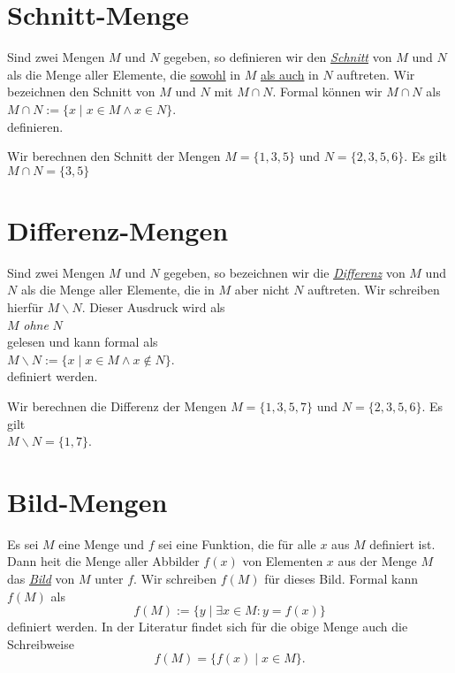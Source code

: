 \section{Schnitt-Menge}
Sind zwei Mengen $M$ und $N$ gegeben, so definieren wir den 
\href{https://de.wikipedia.org/wiki/Menge_(Mathematik)#Schnittmenge_.28Schnitt.2C_auch_.E2.80.9EDurchschnitt.E2.80.9C.29}{\emph{Schnitt}}
von $M$ und $N$ als die Menge aller Elemente, die \underline{sowohl} in $M$ \underline{als auch} in $N$
auftreten.  Wir bezeichnen den Schnitt von $M$ und $N$ mit $M \cap N$.
Formal k\"{o}nnen wir $M \cap N$ als 
\\[0.2cm]
\hspace*{1.3cm} $M \cap N := \{ x \mid x \in M \wedge x \in N \}$.
\\[0.2cm]
definieren.

\example
Wir berechnen den Schnitt der  Mengen $M = \{ 1, 3, 5 \}$ und $N = \{ 2, 3, 5, 6 \}$.  Es gilt
\\[0.2cm]
\hspace*{1.3cm} $M \cap N = \{ 3, 5 \}$
\eoxs

\section{Differenz-Mengen}
 Sind zwei Mengen $M$ und $N$ gegeben, so bezeichnen wir die 
\href{https://de.wikipedia.org/wiki/Menge_(Mathematik)#Differenz_und_Komplement}{\emph{Differenz}}
von $M$ und $N$ als die Menge aller Elemente, die in $M$ aber nicht $N$
 auftreten.  Wir schreiben hierf\"{u}r $M \backslash N$.  Dieser Ausdruck wird als
\\[0.2cm]
\hspace*{1.3cm}
$M$ \emph{ohne} $N$
\\[0.2cm]
gelesen und kann formal als
 \\[0.2cm]
\hspace*{1.3cm} $M \backslash N := \{ x \mid x \in M \wedge x \not\in N \}$. 
 \\[0.2cm] 
definiert werden.


\example
Wir berechnen die Differenz der Mengen $M = \{ 1, 3, 5, 7 \}$ und $N = \{ 2, 3, 5, 6 \}$.  Es gilt
\\[0.2cm]
\hspace*{1.3cm} $M \backslash N = \{ 1, 7 \}$. \eoxs

\section{Bild-Mengen}
Es sei $M$ eine Menge und $f$ sei eine Funktion, die f\"{u}r alle $x$ aus $M$ definiert ist.
Dann hei\3t die Menge aller Abbilder $f(x)$ von Elementen $x$ aus der Menge $M$ das
\href{https://de.wikipedia.org/wiki/Bild_(Mathematik)}{\emph{Bild}} von $M$ unter $f$.  Wir
schreiben $f(M)$ f\"{u}r dieses Bild. 
Formal kann $f(M)$ als
 \[ f(M) := \{ y \;|\; \exists x \in M: y = f(x) \} \]
definiert werden. In der Literatur findet sich f\"{u}r die obige Menge auch die Schreibweise
\[ f(M) = \bigl\{ f(x) \;|\; x \in M \}. \]

